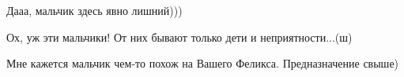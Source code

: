  
 
 
 
 

Дааа, мальчик здесь явно лишний)))

Ох, уж эти мальчики! От них бывают только дети и неприятности...(ш)

Мне кажется мальчик чем-то похож на Вашего Феликса. Предназначение свыше)
